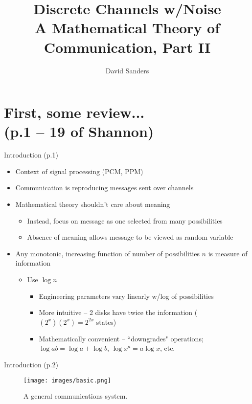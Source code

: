 \documentclass{beamer}
\title{%
  Discrete Channels w/Noise \\
  \normalsize A Mathematical Theory of Communication, Part II}
\author{David Sanders}
\begin{document}
  \maketitle

  \section{First, some review... \\
           \small (p.1 -- 19 of Shannon)}

  \begin{frame}{Introduction \small (p.1)}
    \begin{itemize}
      \item Context of signal processing (PCM, PPM)
      \item Communication is reproducing messages sent over channels
      \item Mathematical theory shouldn't care about meaning
      \begin{itemize}
        \item Instead, focus on message as one selected from many possibilities
        \item Absence of meaning allows message to be viewed as random variable
      \end{itemize}
      \item Any monotonic, increasing function of number of possibilities $n$
      is measure of information
      \begin{itemize}
        \item Use $\log n$
        \begin{itemize}
          \item Engineering parameters vary linearly w/log of possibilities
          \item More intuitive -- 2 disks have twice the information ($(2^x)(2^x) = 2^{2x}$ states)
          \item Mathematically convenient -- ``downgrades" operations; $\log ab
          = \log a + \log b$, $\log x^a = a \log x$, etc.
        \end{itemize}
      \end{itemize}
    \end{itemize}
  \end{frame}

  \begin{frame}{Introduction \small (p.2)}
    \begin{figure}
      \centering
      \texttt{[image: images/basic.png]}
      \caption{A general communications system.}
    \end{figure}
  \end{frame}
\end{document}
